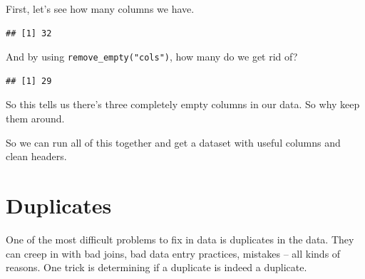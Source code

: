 \documentclass[]{book}
\newenvironment{Shaded}{\begin{snugshade}}{\end{snugshade}}
\newcommand{\KeywordTok}[1]{\textcolor[rgb]{0.13,0.29,0.53}{\textbf{#1}}}
\newcommand{\NormalTok}[1]{#1}
\newcommand{\OperatorTok}[1]{\textcolor[rgb]{0.81,0.36,0.00}{\textbf{#1}}}
\newcommand{\StringTok}[1]{\textcolor[rgb]{0.31,0.60,0.02}{#1}}
\begin{document}
First, let's see how many columns we have.

\begin{Shaded}
\end{Shaded}

\begin{verbatim}
## [1] 32
\end{verbatim}

And by using \texttt{remove\_empty("cols")}, how many do we get rid of?

\begin{Shaded}
\end{Shaded}

\begin{verbatim}
## [1] 29
\end{verbatim}

So this tells us there's three completely empty columns in our data. So why keep them around.

So we can run all of this together and get a dataset with useful columns and clean headers.

\begin{Shaded}
\end{Shaded}

\hypertarget{duplicates}{%
\section{Duplicates}\label{duplicates}}

One of the most difficult problems to fix in data is duplicates in the data. They can creep in with bad joins, bad data entry practices, mistakes -- all kinds of reasons. One trick is determining if a duplicate is indeed a duplicate.
\end{document}
